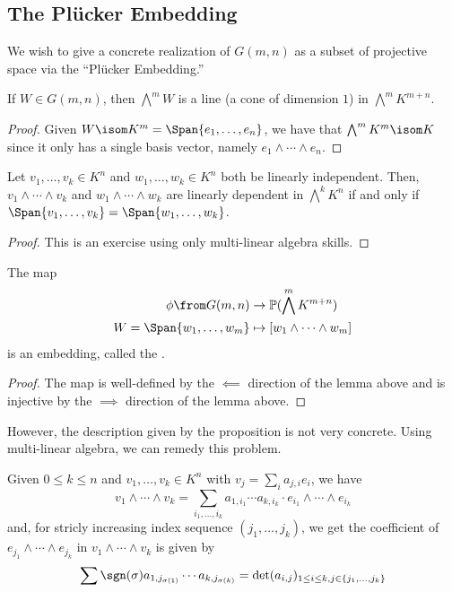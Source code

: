 \documentclass[11pt,leqno,oneside]{amsart}
\numberwithin{thm}{section}
\renewcommand{\P}{\mathbb{P}}
\newcommand{\ExtP}{\bigwedge}
\begin{document}
\subsection{The Pl\"{u}cker Embedding}
We wish to give a concrete realization of \(G(m,n)\) as a subset of
projective space via the ``Pl\"{u}cker Embedding.''
\begin{lem}
  If \(W \in G(m,n)\), then \(\ExtP^m W\) is a line (a cone of dimension
  \(1\)) in \(\ExtP^m K^{m+n}\).
\end{lem}
\begin{proof}
  Given \(W \isom K^m = \Span \{e_1, \ldots, e_n\}\), we have that
  \(\ExtP^m K^m \isom K\) since it 
  only has a single basis vector, namely \(e_1 \wedge \cdots \wedge
  e_n\).
\end{proof}
\begin{lem}
  Let \(v_1, \ldots, v_k \in K^n\) and \(w_1, \ldots, w_k \in K^n\)
  both be linearly independent. Then, \(v_1 \wedge \cdots \wedge v_k\)
  and \(w_1 \wedge \cdots \wedge w_k\) are linearly dependent in
  \(\ExtP^k K^n\) if and only if \(\Span \{v_1, \ldots, v_k\} =
  \Span\{w_1, \ldots, w_k\}\).
\end{lem}
\begin{proof}
  This is an exercise using only multi-linear algebra skills.
\end{proof}
\begin{thm}
  The map
  \begin{align*}
    \phi \from G(m,n) & \to \P(\ExtP^m K^{m+n}) \\
    W = \Span \{w_1, \ldots, w_m\} & \mapsto [w_1 \wedge \cdots
                                     \wedge w_m]
  \end{align*}
  is an embedding, called the .
\end{thm}
\begin{proof}
  The map is well-defined by the \(\impliedby\) direction of the lemma
  above and is injective by the \(\implies\) direction of the lemma
  above. 
\end{proof}
However, the description given by the proposition is not very
concrete. Using multi-linear algebra, we can remedy this problem.
\begin{lem}
  Given \(0 \leq k \leq n\) and \(v_1, \ldots, v_k \in K^n\) with
  \(v_j = \sum_i a_{j,i} 
  e_i\), we have \[
    v_1 \wedge \cdots \wedge v_k = \sum_{i_1, \ldots, i_k} a_{1,i_1}
    \cdots a_{k,i_k} \cdot e_{i_1} \wedge \cdots \wedge e_{i_k}
  \]
  and, for stricly increasing index sequence \((j_1, \ldots, j_k)\),
  we get the coefficient of \(e_{j_1} \wedge \cdots \wedge e_{j_k}\)
  in \(v_1 \wedge \cdots \wedge v_k\) is given by \[
    \sum \sgn(\sigma) a_{1,j_{\sigma(1)}} \cdots a_{k,j_{\sigma(k)}} =
    \det (a_{i,j})_{1 \leq i \leq k, j \in \{j_1, \ldots, j_k\}}
  \]
\end{lem}
\end{document}
